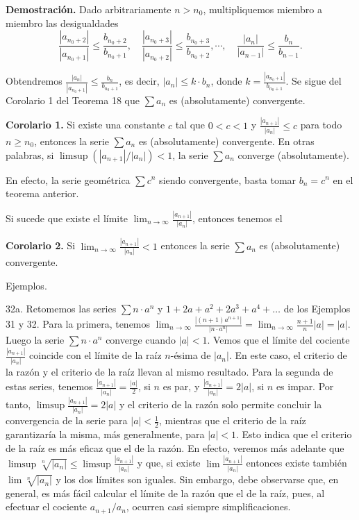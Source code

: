 \documentclass[12pt,oneside]{book}
\begin{document}
\textbf{Demostración.} Dado arbitrariamente \(n > n_0\), multipliquemos miembro a miembro las desigualdades
\[
\frac{|a_{n_0+2}|}{|a_{n_0+1}|} \leq \frac{b_{n_0+2}}{b_{n_0+1}}, \quad \frac{|a_{n_0+3}|}{|a_{n_0+2}|} \leq \frac{b_{n_0+3}}{b_{n_0+2}}, \cdots, \quad \frac{|a_n|}{|a_{n-1}|} \leq \frac{b_n}{b_{n-1}}.
\]

Obtendremos \(\frac{|a_n|}{|a_{n_0+1}|} \leq \frac{b_n}{b_{n_0+1}}\), es decir, \(|a_n| \leq k \cdot b_n\), donde \(k = \frac{|a_{n_0+1}|}{b_{n_0+1}}\). Se sigue del Corolario 1 del Teorema 18 que \(\sum a_n\) es (absolutamente) convergente.

\textbf{Corolario 1.} Si existe una constante \(c\) tal que \(0 < c < 1\) y \(\frac{|a_{n+1}|}{|a_n|} \leq c\) para todo \(n \geq n_0\), entonces la serie \(\sum a_n\) es (absolutamente) convergente. En otras palabras, si \(\limsup(|a_{n+1}|/|a_n|) < 1\), la serie \(\sum a_n\) converge (absolutamente).

En efecto, la serie geométrica \(\sum c^n\) siendo convergente, basta tomar \(b_n = c^n\) en el teorema anterior.

Si sucede que existe el límite \(\lim_{n \to \infty} \frac{|a_{n+1}|}{|a_n|}\), entonces tenemos el

\textbf{Corolario 2.} Si \(\lim_{n \to \infty} \frac{|a_{n+1}|}{|a_n|} < 1\) entonces la serie \(\sum a_n\) es (absolutamente) convergente.

Ejemplos.

32a. Retomemos las series \(\sum n \cdot a^n\) y \(1 + 2a + a^2 + 2a^3 + a^4 + \dots\) de los Ejemplos 31 y 32. Para la primera, tenemos \(\lim_{n \to \infty} \frac{|(n+1)a^{n+1}|}{|n \cdot a^n|} = \lim_{n \to \infty} \frac{n+1}{n} |a| = |a|\). Luego la serie \(\sum n \cdot a^n\) converge cuando \(|a| < 1\). Vemos que el límite del cociente \(\frac{|a_{n+1}|}{|a_n|}\) coincide con el límite de la raíz \(n\)-ésima de \(|a_n|\). En este caso, el criterio de la razón y el criterio de la raíz llevan al mismo resultado. Para la segunda de estas series, tenemos \(\frac{|a_{n+1}|}{|a_n|} = \frac{|a|}{2}\), si \(n\) es par, y \(\frac{|a_{n+1}|}{|a_n|} = 2|a|\), si \(n\) es impar. Por tanto, \(\limsup \frac{|a_{n+1}|}{|a_n|} = 2|a|\) y el criterio de la razón solo permite concluir la convergencia de la serie para \(|a| < \frac{1}{2}\), mientras que el criterio de la raíz garantizaría la misma, más generalmente, para \(|a| < 1\). Esto indica que el criterio de la raíz es más eficaz que el de la razón. En efecto, veremos más adelante que \(\limsup \sqrt[n]{|a_n|} \leq \limsup \frac{|a_{n+1}|}{|a_n|}\) y que, si existe \(\lim \frac{|a_{n+1}|}{|a_n|}\) entonces existe también \(\lim \sqrt[n]{|a_n|}\) y los dos límites son iguales. Sin embargo, debe observarse que, en general, es más fácil calcular el límite de la razón que el de la raíz, pues, al efectuar el cociente \(a_{n+1}/a_n\), ocurren casi siempre simplificaciones.
\end{document}

